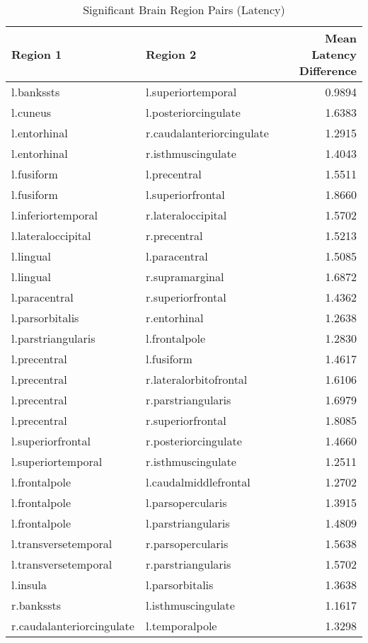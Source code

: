 \begin{table}
\caption{Significant Brain Region Pairs (Latency)}
\label{tab:significant_latency}
\begin{tabular}{llr}
\toprule
Region 1 & Region 2 & Mean Latency Difference \\
\midrule
l.bankssts & l.superiortemporal & 0.9894 \\
l.cuneus & l.posteriorcingulate & 1.6383 \\
l.entorhinal & r.caudalanteriorcingulate & 1.2915 \\
l.entorhinal & r.isthmuscingulate & 1.4043 \\
l.fusiform & l.precentral & 1.5511 \\
l.fusiform & l.superiorfrontal & 1.8660 \\
l.inferiortemporal & r.lateraloccipital & 1.5702 \\
l.lateraloccipital & r.precentral & 1.5213 \\
l.lingual & l.paracentral & 1.5085 \\
l.lingual & r.supramarginal & 1.6872 \\
l.paracentral & r.superiorfrontal & 1.4362 \\
l.parsorbitalis & r.entorhinal & 1.2638 \\
l.parstriangularis & l.frontalpole & 1.2830 \\
l.precentral & l.fusiform & 1.4617 \\
l.precentral & r.lateralorbitofrontal & 1.6106 \\
l.precentral & r.parstriangularis & 1.6979 \\
l.precentral & r.superiorfrontal & 1.8085 \\
l.superiorfrontal & r.posteriorcingulate & 1.4660 \\
l.superiortemporal & r.isthmuscingulate & 1.2511 \\
l.frontalpole & l.caudalmiddlefrontal & 1.2702 \\
l.frontalpole & l.parsopercularis & 1.3915 \\
l.frontalpole & l.parstriangularis & 1.4809 \\
l.transversetemporal & r.parsopercularis & 1.5638 \\
l.transversetemporal & r.parstriangularis & 1.5702 \\
l.insula & l.parsorbitalis & 1.3638 \\
r.bankssts & l.isthmuscingulate & 1.1617 \\
r.caudalanteriorcingulate & l.temporalpole & 1.3298 \\

\end{tabular}
\end{table}
